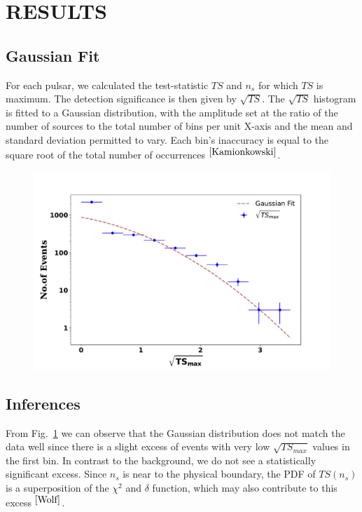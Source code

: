 \documentclass{article}
\begin{document}
\section{\Large RESULTS}
\subsection{\large Gaussian Fit}
For each pulsar, we calculated the test-statistic $TS$ and $n_s$ for which $TS$ is maximum.
The detection significance is then given by $\sqrt{TS}$. The $\sqrt{TS}$ histogram is fitted to a Gaussian distribution, with the amplitude set at the ratio of the number of sources to the total number of bins per unit X-axis and the mean and standard deviation permitted to vary. Each bin's inaccuracy is equal to the square root of the total number of occurrences$^{~\cite{Kamionkowski}}$.

\begin{figure}[htb]
	\begin{center}
		\includegraphics[width=0.75\columnwidth]{Images/sqrt(TSmax)final}
	\end{center}
	\label{fig:gfit}	
\end{figure}

\subsection{\large Inferences}
From Fig.~\ref{fig:gfit} we can observe that the Gaussian distribution does not match the data well since there is a slight excess of events with very low $\sqrt{TS_{max}}$ values in the first bin. In contrast to the background, we do not see a statistically significant excess. Since $n_s$ is near to the physical boundary, the PDF of $TS(n_s)$ is a superposition of the $\chi^2$ and $\delta$ function, which may also contribute to this excess$^{~\cite{Wolf}}$.
\end{document}
